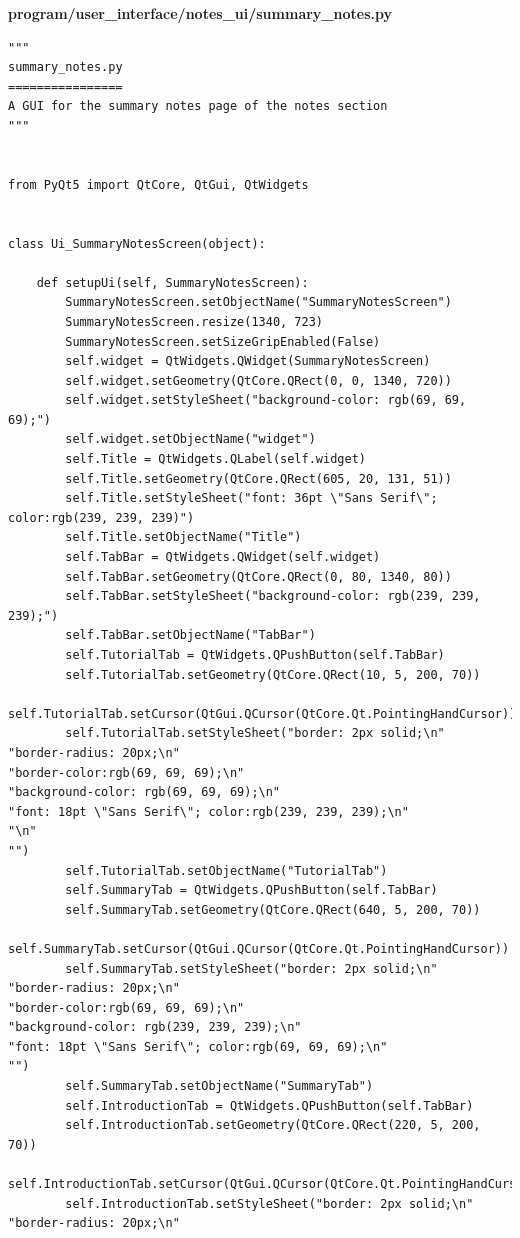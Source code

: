 \documentclass{article}
\begin{document}
\textbf{program/user\_interface/notes\_ui/summary\_notes.py}
\begin{lstlisting}
"""
summary_notes.py
================
A GUI for the summary notes page of the notes section
"""


from PyQt5 import QtCore, QtGui, QtWidgets


class Ui_SummaryNotesScreen(object):

    def setupUi(self, SummaryNotesScreen):
        SummaryNotesScreen.setObjectName("SummaryNotesScreen")
        SummaryNotesScreen.resize(1340, 723)
        SummaryNotesScreen.setSizeGripEnabled(False)
        self.widget = QtWidgets.QWidget(SummaryNotesScreen)
        self.widget.setGeometry(QtCore.QRect(0, 0, 1340, 720))
        self.widget.setStyleSheet("background-color: rgb(69, 69, 69);")
        self.widget.setObjectName("widget")
        self.Title = QtWidgets.QLabel(self.widget)
        self.Title.setGeometry(QtCore.QRect(605, 20, 131, 51))
        self.Title.setStyleSheet("font: 36pt \"Sans Serif\"; color:rgb(239, 239, 239)")
        self.Title.setObjectName("Title")
        self.TabBar = QtWidgets.QWidget(self.widget)
        self.TabBar.setGeometry(QtCore.QRect(0, 80, 1340, 80))
        self.TabBar.setStyleSheet("background-color: rgb(239, 239, 239);")
        self.TabBar.setObjectName("TabBar")
        self.TutorialTab = QtWidgets.QPushButton(self.TabBar)
        self.TutorialTab.setGeometry(QtCore.QRect(10, 5, 200, 70))
        self.TutorialTab.setCursor(QtGui.QCursor(QtCore.Qt.PointingHandCursor))
        self.TutorialTab.setStyleSheet("border: 2px solid;\n"
"border-radius: 20px;\n"
"border-color:rgb(69, 69, 69);\n"
"background-color: rgb(69, 69, 69);\n"
"font: 18pt \"Sans Serif\"; color:rgb(239, 239, 239);\n"
"\n"
"")
        self.TutorialTab.setObjectName("TutorialTab")
        self.SummaryTab = QtWidgets.QPushButton(self.TabBar)
        self.SummaryTab.setGeometry(QtCore.QRect(640, 5, 200, 70))
        self.SummaryTab.setCursor(QtGui.QCursor(QtCore.Qt.PointingHandCursor))
        self.SummaryTab.setStyleSheet("border: 2px solid;\n"
"border-radius: 20px;\n"
"border-color:rgb(69, 69, 69);\n"
"background-color: rgb(239, 239, 239);\n"
"font: 18pt \"Sans Serif\"; color:rgb(69, 69, 69);\n"
"")
        self.SummaryTab.setObjectName("SummaryTab")
        self.IntroductionTab = QtWidgets.QPushButton(self.TabBar)
        self.IntroductionTab.setGeometry(QtCore.QRect(220, 5, 200, 70))
        self.IntroductionTab.setCursor(QtGui.QCursor(QtCore.Qt.PointingHandCursor))
        self.IntroductionTab.setStyleSheet("border: 2px solid;\n"
"border-radius: 20px;\n"

\end{lstlisting}
\end{document}
